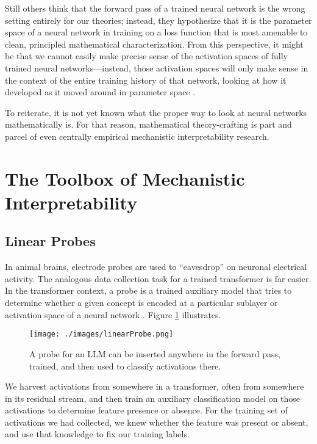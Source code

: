 Still others think that the forward pass of a trained neural network is the
wrong setting entirely for our theories; instead, they hypothesize that it is
the parameter space of a neural network in training on a loss function that is
most amenable to clean, principled mathematical characterization. From this
perspective, it might be that we cannot easily make precise sense of the
activation spaces of fully trained neural networks---instead, those activation
spaces will only make sense in the context of the entire training history of
that network, looking at how it developed as it moved around in parameter
space \cite{hoogland2025lossland, bushnaq2024degeneracy}.

To reiterate, it is not yet known what the proper way to look at neural
networks mathematically is. For that reason, mathematical theory-crafting is
part and parcel of even centrally empirical mechanistic interpretability
research.

\section{The Toolbox of Mechanistic Interpretability}

\subsection{Linear Probes}

In animal brains, electrode probes are used to ``eavesdrop'' on neuronal
electrical activity. The analogous data collection task for a trained
transformer is far easier. In the transformer context, a probe is a trained
auxiliary model that tries to determine whether a given concept is encoded at a
particular sublayer or activation space of a neural network
\cite{alain2018intermediate, belinkov2021classifiers}. Figure \ref{linearProbe}
illustrates.

\begin{figure}[ht]
\centering
\texttt{[image: ./images/linearProbe.png]}
\caption[Jeff Yoshimi; the line art for the probe was generated by ChatGPT.]{ A
      probe for an LLM can be inserted anywhere in the forward pass, trained,
      and then used to classify activations there.}
\label{linearProbe}
\end{figure}

We harvest activations from somewhere in a transformer, often from somewhere in
its residual stream, and then train an auxiliary classification model on those
activations to determine feature presence or absence. For the training set of
activations we had collected, we knew whether the feature was present or
absent, and use that knowledge to fix our training labels.

